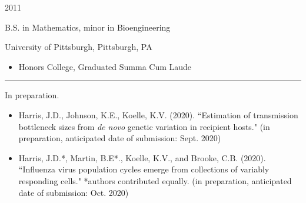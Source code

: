 \documentclass[a4paper,10pt]{article}
\newlength{\cvcolumngapwidth}
\newlength{\cvleftcolumnwidth}
\newlength{\cvrightcolumnwidth}
\newcommand{\cvsectionstyle}[1]{{\normalsize\cvsectionfont\textcolor{cvsectioncolor}{#1}}}
\newcommand{\cvtitlestyle}[1]{{\large\cvtitlefont\textcolor{cvtitlecolor}{#1}}}
\newcommand{\cvdurationstyle}[1]{{\small\cvdurationfont\textcolor{cvdurationcolor}{#1}}}
\newlength{\cvafteritemskipamount}
\newlength{\cvaftersectionskipamount}
\newlength{\cvbetweensectionandheadingextraskipamount}
\newlength{\cvaftertitleskipamount}
\newlength{\cvparskip}
\newcommand{\cvsection}[1]{
    \begin{minipage}[t]{\cvleftcolumnwidth}
        \raggedleft\cvsectionstyle{#1}
    \end{minipage}%
    \hspace{\cvcolumngapwidth}%
    \begin{minipage}[t]{\cvrightcolumnwidth}
        \textcolor{cvrulecolor}{\rule{\cvrightcolumnwidth}{0.3mm}}
    \end{minipage}

    \vspace{\cvaftersectionskipamount}
}
\newcommand{\cvitem}[2]{
    \begin{minipage}[t]{\cvleftcolumnwidth}
        \raggedleft #1
    \end{minipage}%
    \hspace{\cvcolumngapwidth}%
    \begin{minipage}[t]{\cvrightcolumnwidth}
        \setlength{\parskip}{\cvparskip} #2
    \end{minipage}

    \vspace{\cvafteritemskipamount}
}
\newcommand{\cvtitle}[1]{
    \cvtitlestyle{#1}

    \vspace{\cvaftertitleskipamount}
    \vspace{-\cvparskip}
}
\begin{document}
\cvitem{
    \cvdurationstyle{2011}
}{
    \cvtitle{B.S. in Mathematics, minor in Bioengineering}
	University of Pittsburgh, Pittsburgh, PA
    \begin{itemize}[leftmargin=*]
        \item  Honors College, Graduated Summa Cum Laude
    \end{itemize}
}

\cvsection{PUBLICATIONS}

\cvitem{
    \cvdurationstyle{In preparation.}
}{
    \begin{itemize}[leftmargin=*]
    	\item Harris, J.D., Johnson, K.E., Koelle, K.V. (2020). ``Estimation of transmission bottleneck sizes from \emph{de novo} genetic variation in recipient hosts." (in preparation, anticipated date of submission: Sept. 2020) \\
	\item Harris, J.D.*, Martin, B.E*., Koelle, K.V., and Brooke, C.B. (2020). ``Influenza virus population cycles emerge from collections of variably responding cells." *authors contributed equally. (in preparation, anticipated date of submission: Oct. 2020) \\
    \end{itemize}
}
\end{document}
